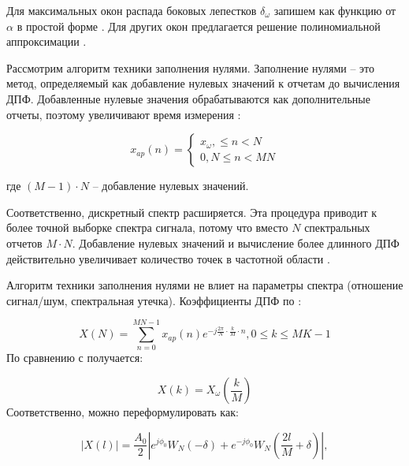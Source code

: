 Для максимальных окон распада боковых лепестков $\delta_{\omega}$ запишем как функцию от $\alpha$ в простой форме \cite{zhang2001algorithm, qian2007interharmonics, xie1996nonlinear, luo2015phase, belega2009multifrequency, belega2010accuracy}. Для других окон предлагается решение полиномиальной аппроксимации \cite{duda2011dft}. 

Рассмотрим алгоритм техники заполнения нулями. Заполнение нулями -- это метод, определяемый как добавление нулевых значений к отчетам до вычисления ДПФ. Добавленные нулевые значения обрабатываются как дополнительные отчеты, поэтому увеличивают время измерения :

\begin{equation}
	\label{eq:equation21}
	x_{ap}(n)=
	\begin{cases}
		x_{\omega}, \leq n < N
		\\ 0, N \leq n < MN
	\end{cases}
\end{equation}

где $(M-1) \cdot N$ -- добавление нулевых значений.

Соответственно, дискретный спектр расширяется. Эта процедура приводит к более точной выборке спектра сигнала, потому что вместо $N$ спектральных отчетов $M \cdot N$. Добавление нулевых значений и вычисление более длинного ДПФ действительно увеличивает количество точек в частотной области \cite{dorf2006circuits}.

Алгоритм техники заполнения нулями не влиет на параметры спектра (отношение сигнал/шум, спектральная утечка).  Коэффициенты ДПФ по :

\begin{equation}
	\label{eq:equation22}
	X(N)= \sum_{n=0}^{MN-1} x_{ap}(n) e^{-j \frac{2 \pi}{N}\cdot \frac{k}{M} \cdot n}, 0\leq k \leq MK-1
\end{equation}
По сравнению с  получается:

\begin{equation}
	\label{eq:equation23}
	X(k)= X_\omega \left( {\frac{k}{M}}\right)  \end{equation}
Соответственно,  можно переформулировать как:

\begin{equation}
	\label{eq:equation24}
	\left| {X(l)} \right|   = \frac{A_0}{2}\left| {e^{j\phi_0}W_N(-\delta)+e^{-j\phi_0}W_N \left(\frac{2l}{M}+\delta \right)} \right|,
\end{equation}

